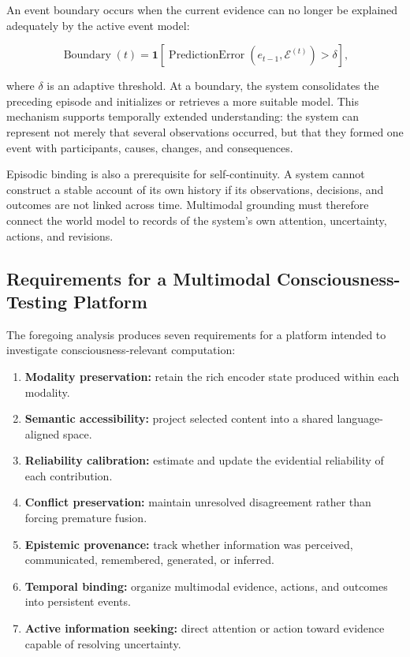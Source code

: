 An event boundary occurs when the current evidence can no longer be explained adequately by the active event model:

\begin{equation}
\operatorname{Boundary}(t)
=
\mathbf{1}
\left[
\operatorname{PredictionError}(e_{t-1},\mathcal{E}^{(t)}) > \delta
\right],
\label{eq:event-boundary}
\end{equation}

where $\delta$ is an adaptive threshold. At a boundary, the system consolidates the preceding episode and initializes or retrieves a more suitable model. This mechanism supports temporally extended understanding: the system can represent not merely that several observations occurred, but that they formed one event with participants, causes, changes, and consequences.

Episodic binding is also a prerequisite for self-continuity. A system cannot construct a stable account of its own history if its observations, decisions, and outcomes are not linked across time. Multimodal grounding must therefore connect the world model to records of the system's own attention, uncertainty, actions, and revisions.

\subsection{Requirements for a Multimodal Consciousness-Testing Platform}
\label{subsec:multimodal-platform-requirements}

The foregoing analysis produces seven requirements for a platform intended to investigate consciousness-relevant computation:

\begin{enumerate}
    \item \textbf{Modality preservation:} retain the rich encoder state produced within each modality.
    \item \textbf{Semantic accessibility:} project selected content into a shared language-aligned space.
    \item \textbf{Reliability calibration:} estimate and update the evidential reliability of each contribution.
    \item \textbf{Conflict preservation:} maintain unresolved disagreement rather than forcing premature fusion.
    \item \textbf{Epistemic provenance:} track whether information was perceived, communicated, remembered, generated, or inferred.
    \item \textbf{Temporal binding:} organize multimodal evidence, actions, and outcomes into persistent events.
    \item \textbf{Active information seeking:} direct attention or action toward evidence capable of resolving uncertainty.
\end{enumerate}

